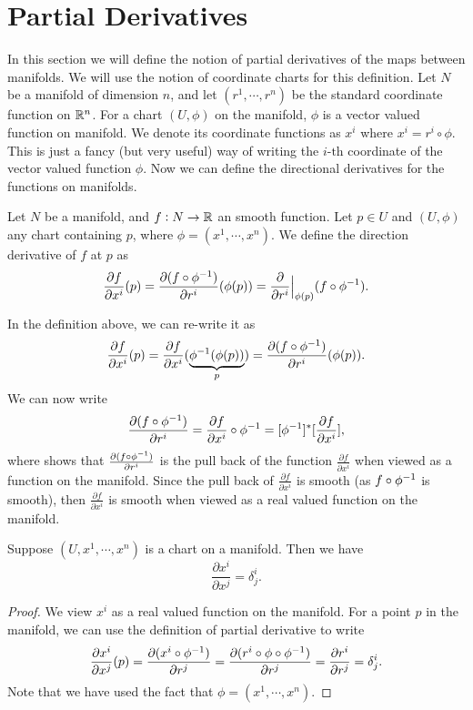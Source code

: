 \section{Partial Derivatives}
In this section we will define the notion of partial derivatives of the maps between manifolds. We will use the notion of coordinate charts for this definition. Let $ N $ be a manifold of dimension $ n $, and let $ (r^1,\cdots,r^n) $ be the standard coordinate function on $ \mathbb{R}^n $. For a chart $ (U,\phi) $ on the manifold, $ \phi $ is a vector valued function on manifold. We denote its coordinate functions as $ x^i $ where $ x^i = r^i \circ \phi $. This is just a fancy (but very useful) way of writing the $ i\text{-th}$ coordinate of the vector valued function $ \phi $. Now we can define the directional derivatives for the functions on manifolds.

\begin{definition}
	\label{def:DirectionalDerivativeOnManifold}
	Let $ N $ be a manifold, and $ f:N \to \mathbb{R} $ an smooth function. Let $ p\in U $ and $ (U,\phi) $ any chart containing $ p $, where $ \phi = (x^1,\cdots,x^n) $. We define the direction derivative of $ f $ at $ p $ as 
	\[ \frac{\partial f}{\partial x^i}(p) = \frac{\partial (f\circ \phi^{-1})}{\partial r^i}(\phi(p)) = \frac{\partial}{\partial r^i}\big|_{\phi(p)} (f\circ\phi^{-1}). \]
\end{definition}

\begin{remark}
	In the definition above, we can re-write it as
	\[ \frac{\partial f}{\partial x^i}(p) =\frac{\partial f}{\partial x^i}(\underbrace{\phi^{-1}(\phi(p))}_{p}) = \frac{\partial (f\circ \phi^{-1})}{\partial r^i}(\phi(p)). \]
	We can now write
	\[ \frac{\partial (f\circ \phi^{-1})}{\partial r^i} =\frac{\partial f}{\partial x^i} \circ \phi^{-1} = [\phi^{-1}]^* [\frac{\partial f}{\partial x^i}],  \]
	where shows that $ \frac{\partial (f\circ \phi^{-1})}{\partial r^i} $ is the pull back of the function $ \frac{\partial f}{\partial x^i} $ when viewed as a function on the manifold. Since the pull back of $ \frac{\partial f}{\partial x^i} $ is smooth (as $ f\circ \phi^{-1} $ is smooth), then $ \frac{\partial f}{\partial x^i} $ is smooth when viewed as a real valued function on the manifold.
\end{remark}

\begin{proposition}
	Suppose $ (U,x^1,\cdots,x^n) $ is a chart on a manifold. Then we have
	\[ \frac{\partial x^i}{\partial x^j} = \delta^i_j. \]
\end{proposition}
\begin{proof}
	We view $ x^i $ as a real valued function on the manifold. For a point $ p $ in the manifold, we can use the definition of partial derivative to write
	\[ \frac{\partial x^i}{\partial x^j}(p) = \frac{\partial (x^i \circ \phi^{-1})}{\partial r^j} = \frac{\partial (r^i \circ \phi \circ \phi^{-1})}{\partial r^j} = \frac{\partial r^i}{\partial r^j} = \delta^i_j. \]
	Note that we have used the fact that $ \phi = (x^1,\cdots,x^n) $.
\end{proof}

